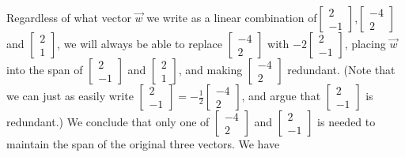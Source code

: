 \documentclass{ximera}
\begin{document}
Regardless of what vector $\vec{w}$ we write as a linear combination of$\begin{bmatrix}2\\-1\end{bmatrix}$,$ \begin{bmatrix}-4\\2\end{bmatrix}$ and $\begin{bmatrix}2\\1\end{bmatrix}$, we will always be able to replace $\begin{bmatrix}-4\\2\end{bmatrix}$ with $-2\begin{bmatrix}2\\-1\end{bmatrix}$, placing $\vec{w}$ into the span of $\begin{bmatrix}2\\-1\end{bmatrix}$ and $\begin{bmatrix}2\\1\end{bmatrix}$, and making $\begin{bmatrix}-4\\2\end{bmatrix}$ redundant.  (Note that we can just as easily write $\begin{bmatrix}2\\-1\end{bmatrix}=-\frac{1}{2}\begin{bmatrix}-4\\2\end{bmatrix}$, and argue that $\begin{bmatrix}2\\-1\end{bmatrix}$ is redundant.)  We conclude that only one of $\begin{bmatrix}-4\\2\end{bmatrix}$ and $\begin{bmatrix}2\\-1\end{bmatrix}$ is needed to maintain the span of the original three vectors.  We have
\end{document}

